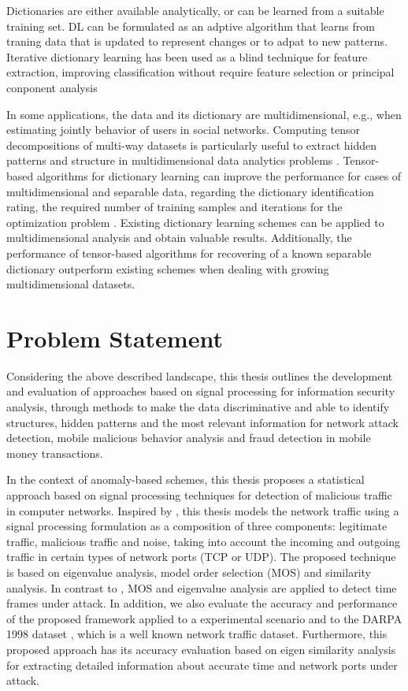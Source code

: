 Dictionaries are either available analytically, or can be learned from a suitable training set. DL can be formulated as an adptive algorithm that learns from traning data that is updated to represent changes or to adpat to new patterns. Iterative dictionary learning has been used as a blind technique for feature extraction, improving classification without require feature selection or principal conponent analysis

In some applications, the data and its dictionary are multidimensional, e.g., when estimating jointly behavior of users in social networks. Computing tensor decompositions of multi-way datasets is particularly useful to extract hidden patterns and structure in multidimensional data analytics problems \cite{kolda2009tensor}. Tensor-based algorithms for dictionary learning can improve the performance for cases of multidimensional and separable data, regarding the dictionary identification rating, the required number of training samples and iterations for the optimization problem \cite{roemer2014tensor}. Existing dictionary learning schemes can be applied to multidimensional analysis and obtain valuable results. Additionally, the performance of tensor-based algorithms for recovering of a known separable dictionary outperform existing schemes when dealing with growing multidimensional datasets.


\section{Problem Statement}
\label{sc:problems}

Considering the above described landscape, this thesis outlines the development and evaluation of approaches based on signal processing for information security analysis, through methods to make the data discriminative and able to identify structures, hidden patterns and the most relevant information for network attack detection, mobile malicious behavior analysis and fraud detection in mobile money transactions.

In the context of anomaly-based schemes, this thesis proposes a statistical approach based on signal processing techniques for detection of malicious traffic in computer networks. Inspired by \cite{david2011blind,da2012improved}, this thesis models the network traffic using a signal processing formulation as a composition of three components: legitimate traffic, malicious traffic and noise, taking into account the incoming and outgoing traffic in certain types of network ports (TCP or UDP). The proposed technique is based on eigenvalue analysis, model order selection (MOS) and similarity analysis. In contrast to \cite{david2011blind,da2012improved,tenorio2013greatest}, MOS and eigenvalue analysis are applied to detect time frames under attack. In addition, we also evaluate the accuracy and performance of the proposed framework applied to a experimental scenario and to the DARPA 1998 dataset \citep{osanaiye2016distributed}, which is a well known network traffic dataset. Furthermore, this proposed approach has its accuracy evaluation based on eigen similarity analysis for extracting detailed information about accurate time and network ports under attack.


